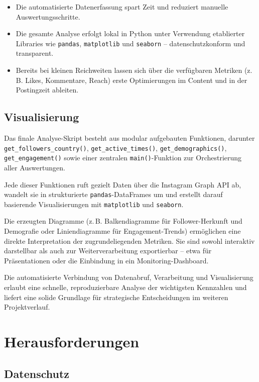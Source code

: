 \documentclass[a4paper,12pt]{article}
\begin{document}
\begin{itemize}
    \item Die automatisierte Datenerfassung spart Zeit und reduziert manuelle Auswertungsschritte.
    
    \item Die gesamte Analyse erfolgt lokal in Python unter Verwendung etablierter Libraries wie \texttt{pandas}, \texttt{matplotlib} und \texttt{seaborn} – datenschutzkonform und transparent.
    
    \item Bereits bei kleinen Reichweiten lassen sich über die verfügbaren Metriken (z.\,B. Likes, Kommentare, Reach) erste Optimierungen im Content und in der Postingzeit ableiten.
\end{itemize}


\subsection{Visualisierung}

Das finale Analyse-Skript besteht aus modular aufgebauten Funktionen, darunter \texttt{get\_followers\_country()}, \texttt{get\_active\_times()}, \texttt{get\_demographics()}, \texttt{get\_engagement()} sowie einer zentralen \texttt{main()}-Funktion zur Orchestrierung aller Auswertungen.  

Jede dieser Funktionen ruft gezielt Daten über die Instagram Graph API ab, wandelt sie in strukturierte \texttt{pandas}-DataFrames um und erstellt darauf basierende Visualisierungen mit \texttt{matplotlib} und \texttt{seaborn}.  

Die erzeugten Diagramme (z.\,B. Balkendiagramme für Follower-Herkunft und Demografie oder Liniendiagramme für Engagement-Trends) ermöglichen eine direkte Interpretation der zugrundeliegenden Metriken. Sie sind sowohl interaktiv darstellbar als auch zur Weiterverarbeitung exportierbar – etwa für Präsentationen oder die Einbindung in ein Monitoring-Dashboard.

Die automatisierte Verbindung von Datenabruf, Verarbeitung und Visualisierung erlaubt eine schnelle, reproduzierbare Analyse der wichtigsten Kennzahlen und liefert eine solide Grundlage für strategische Entscheidungen im weiteren Projektverlauf.


\section{Herausforderungen}
\subsection{Datenschutz}
\end{document}
